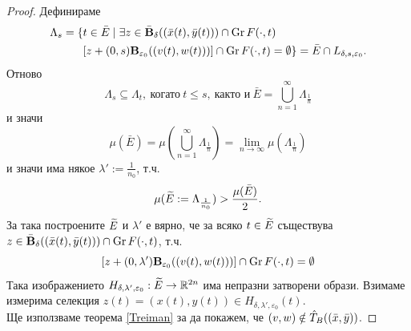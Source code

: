 \begin{proof}
    Дефинираме
    \begin{align*}
        \Lambda_s=\{&t\in\bar{E} \mid \exists z\in \bar{\textbf{B}}_{\delta}((\bar{x}(t),\bar{y}(t)))\cap\operatorname{Gr} F(\cdot, t)\\
        &[z + (0, s)\textbf{B}_{\varepsilon_0}((v(t),w(t)))]\cap\operatorname{Gr} F(\cdot, t) = \emptyset\} =
        \bar{E} \cap L_{\delta,s,\varepsilon_0}.
    \end{align*}
    Отново
    \[
        \Lambda_s \subseteq \Lambda_t,\ \text{когато}\ t\leq s,\ \text{както и}\ 
        \bar{E} = \bigcup_{n = 1}^{\infty} \Lambda_{\frac{1}{n}}
    \]
    и значи
    \[
        \mu(\bar{E}) =
        \mu\left(\bigcup_{n=1}^{\infty} \Lambda_{\frac{1}{n}}\right) =
        \lim_{n\to\infty} \mu(\Lambda_{\frac{1}{n}})
    \]
    и значи има някое $\lambda' := \frac{1}{n_0}$, т.ч.
    \[
        \mu(\widetilde{E} := \Lambda_\frac{1}{n_0}) > \frac{\mu(\bar{E})}{2}.
    \]
    За така построените $\widetilde{E}$ и $\lambda'$ е вярно, че за всяко $t\in\widetilde{E}$ съществува $z\in \bar{\textbf{B}}_{\delta}((\bar{x}(t),\bar{y}(t)))\cap\operatorname{Gr} F(\cdot, t)$, т.ч.
    \[
        [z + (0, \lambda')\textbf{B}_{\varepsilon_0}((v(t),w(t)))]\cap\operatorname{Gr} F(\cdot, t) = \emptyset
    \]
    Така изображението $H_{\delta,\lambda',\varepsilon_0}:\widetilde{E}\to\mathbb{R}^{2n}$ има непразни затворени образи. Взимаме измерима селекция $z(t) = (x(t),y(t)) \in H_{\delta,\lambda',\varepsilon_0}(t)$.\\
    Ще използваме теорема \ref{Treiman} за да покажем, че $(v,w)\notin \hat T_B((\bar{x},\bar{y}))$.


\end{proof}
